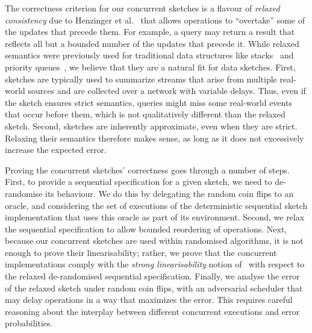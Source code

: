 
 The correctness criterion for our concurrent sketches is a flavour of 
 \emph{relaxed consistency} due to Henzinger et al.~\cite{Henzinger}    
 that allows operations to ``overtake'' some of the updates that precede them.  
 For example, a query may return a result that reflects all but a bounded number of the updates
 that precede it. 
 While relaxed semantics were previously used for traditional data structures like stacks~\cite{Henzinger}
 and priority queues~\cite{alistarh}, we believe that they are a natural fit for data sketches. 
First, sketches are typically used to summarize streams that  arise from multiple real-world sources  
and are collected over a network with variable delays. Thus, even if the sketch ensures strict semantics, 
queries might miss some real-world events that occur before them, which is not qualitatively different than the
relaxed sketch. Second, sketches are inherently approximate, even when they are strict. 
Relaxing their semantics therefore makes sense, as long as it does not excessively increase the expected error. 

Proving the concurrent sketches' correctness goes through a number of steps. First, to provide a sequential specification for
a given sketch, we need to de-randomise its behaviour. We do this by delegating the random coin flips to an oracle,
and considering the set of executions of the deterministic
sequential sketch implementation that uses this oracle
as part of its environment.
Second, we relax the sequential specification to allow bounded reordering of operations.
Next, because our concurrent sketches are used within randomised algorithms, 
it is not enough to prove their linearisability; rather, 
we prove that the concurrent implementations comply with the \emph{strong linearisability}
notion of~\cite{Wojciech} with respect to the relaxed de-randomised sequential specification. 
%
Finally, 
we analyse the error of the relaxed sketch under random coin flips, with an adversarial scheduler that may delay operations in a
way that maximizes the error. This requires careful reasoning about the interplay between different concurrent executions and error probabilities.


